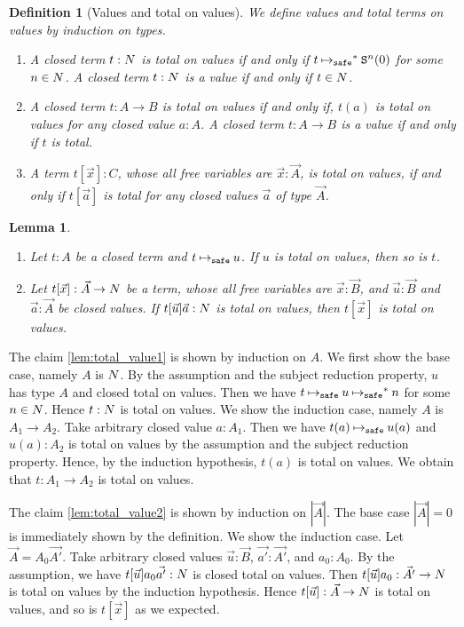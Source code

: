 \documentclass{article}
\newtheorem{lemma}[theorem]{Lemma}
\newtheorem{definition}[theorem]{Definition}
\newenvironment{proof}[1][Proof]{\begin{trivlist}
\item[\hskip \labelsep {\bfseries #1}]}{\end{trivlist}}
\begin{document}
\begin{definition}[Values and total on values]
  We define values and total terms on values by induction on types. 
  \begin{enumerate}
  \item
    A closed term $t:{N}$ is total on values
    if and only if $t \mathbin{\mathbin{\mapsto}_{\hbox{\scriptsize \tt safe}}}^* {\tt S}^n(0)$ for some $n\in {N}$.
    A closed term $t:{N}$ is a value if and only if $t \in {N}$.
  \item
    A closed term $t:A\rightarrow B$ is total on values
    if and only if, $t(a)$ is total on values for any closed value $a:A$.
    A closed term $t:A\rightarrow B$ is a value if and only if $t$ is total.
  \item
    A term $t[\vec{x}]:C$, whose all free variables are $\vec{x}:\vec{A}$, is
    total on values, if and only if
    $t[\vec{a}]$ is total for any closed values $\vec{a}$ of type $\vec{A}$.
  \end{enumerate}
\end{definition}

\begin{lemma}\label{lem:total_value}
  \begin{enumerate}
  \item\label{lem:total_value1}
    Let $t:A$ be a closed term and $t \mathbin{\mathbin{\mapsto}_{\hbox{\scriptsize \tt safe}}} u$.
    If $u$ is total on values, then so is $t$.
  \item\label{lem:total_value2}
    Let $t[\vec{x}]:\vec{A}\rightarrow{N}$ be a term,
    whose all free variables are $\vec{x}:\vec{B}$,
    and $\vec{u}:\vec{B}$ and $\vec{a}:\vec{A}$ be closed values.
    If $t[\vec{u}]\vec{a}:{N}$ is total on values, then $t[\vec{x}]$ is total on values. 
  \end{enumerate}
\end{lemma}
\begin{proof}
  The claim \ref{lem:total_value1} is shown by induction on $A$. 
  We first show the base case, namely $A$ is ${N}$.
  By the assumption and the subject reduction property, $u$ has type $A$ and closed total on values.
  Then we have $t \mathbin{\mathbin{\mapsto}_{\hbox{\scriptsize \tt safe}}} u \mathbin{\mathbin{\mapsto}_{\hbox{\scriptsize \tt safe}}}^* n$ for some $n\in{N}$. 
  Hence $t:{N}$ is total on values.
  We show the induction case, namely $A$ is $A_1\rightarrow A_2$.
  Take arbitrary closed value $a:A_1$. Then we have $t(a) \mathbin{\mathbin{\mapsto}_{\hbox{\scriptsize \tt safe}}} u(a)$ and 
  $u(a):A_2$ is total on values by the assumption and the subject reduction property.
  Hence, by the induction hypothesis, $t(a)$ is total on values. 
  We obtain that $t:A_1\rightarrow A_2$ is total on values. 
  
  The claim \ref{lem:total_value2} is shown by induction on $|\vec{A}|$.
  The base case $|\vec{A}| = 0$ is immediately shown by the definition.
  We show the induction case. Let $\vec{A} = A_0\vec{A'}$.
  Take arbitrary closed values $\vec{u}:\vec{B}$, $\vec{a'}:\vec{A'}$, and $a_0:A_0$. 
  By the assumption, we have $t[\vec{u}]a_0\vec{a'}:{N}$ is closed total on values. 
  Then $t[\vec{u}]a_0:\vec{A'}\rightarrow{N}$ is total on values by the induction hypothesis.
  Hence $t[\vec{u}]:\vec{A}\rightarrow{N}$ is total on values,
  and so is $t[\vec{x}]$ as we expected.
\end{proof}
\end{document}
